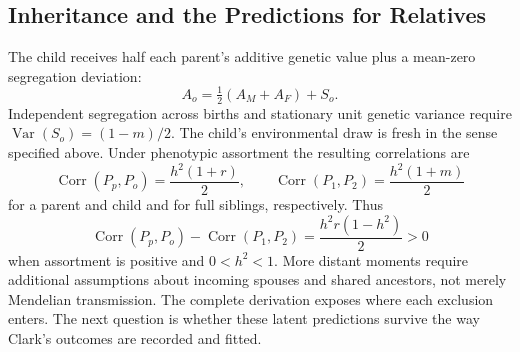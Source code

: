 \subsection{Inheritance and the Predictions for Relatives}
The child receives half each parent's additive genetic value plus a
mean-zero segregation deviation:
\[
 A_o=\tfrac12(A_M+A_F)+S_o.
\]
Independent segregation across births and stationary unit genetic variance
require $\operatorname{Var}(S_o)=(1-m)/2$. The child's environmental draw
is fresh in the sense specified above. Under phenotypic assortment the
resulting correlations are
\[
 \operatorname{Corr}(P_p,P_o)=\frac{h^2(1+r)}2,
 \qquad
 \operatorname{Corr}(P_1,P_2)=\frac{h^2(1+m)}2
\]
for a parent and child and for full siblings, respectively. Thus
\begin{equation}
 \operatorname{Corr}(P_p,P_o)-\operatorname{Corr}(P_1,P_2)
 =\frac{h^2r(1-h^2)}2>0
 \label{eq:overview-gap}
\end{equation}
when assortment is positive and $0<h^2<1$. More distant moments require
additional assumptions about incoming spouses and shared ancestors,
not merely Mendelian transmission. The complete derivation exposes where
each exclusion enters. The next question is whether these latent
predictions survive the way Clark's outcomes are recorded and fitted.

